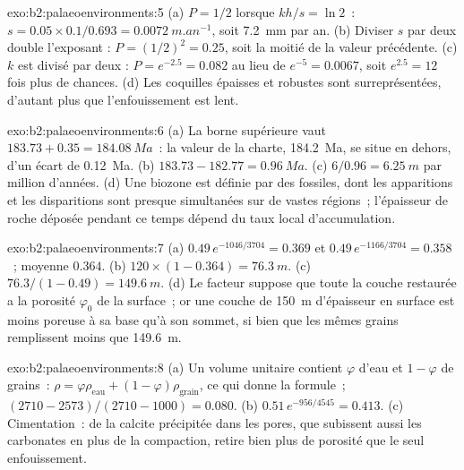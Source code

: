 \begin{solution}{exo:b2:palaeoenvironments:5}
(a) $P = 1/2$ lorsque $kh/s = \ln 2$~: $s = 0.05 \times 0.1/0.693 = \qty{0.0072}{m.an^{-1}}$, soit \qty{7.2}{mm}
par an. (b) Diviser $s$ par deux double l'exposant : $P = (1/2)^2 = 0.25$, soit la moitié de la valeur précédente.
(c) $k$ est divisé par deux : $P = e^{-2.5} = 0.082$ au lieu de $e^{-5} = 0.0067$, soit $e^{2.5} = 12$ fois plus de
chances. (d) Les coquilles épaisses et robustes sont surreprésentées, d'autant plus que l'enfouissement est lent.
\end{solution}

\begin{solution}{exo:b2:palaeoenvironments:6}
(a) La borne supérieure vaut $183.73 + 0.35 = \qty{184.08}{Ma}$~: la valeur de la charte, \qty{184.2}{Ma}, se situe
en dehors, d'un écart de \qty{0.12}{Ma}. (b) $183.73 - 182.77 = \qty{0.96}{Ma}$. (c) $6/0.96 =
\qty{6.25}{m}$ par million d'années. (d) Une biozone est définie par des fossiles, dont les apparitions et les
disparitions sont presque simultanées sur de vastes régions~; l'épaisseur de roche déposée pendant ce temps
dépend du taux local d'accumulation.
\end{solution}

\begin{solution}{exo:b2:palaeoenvironments:7}
(a) $0.49\,e^{-1046/3704} = 0.369$ et $0.49\,e^{-1166/3704} = 0.358$~; moyenne $0.364$. (b) $120
\times (1 - 0.364) = \qty{76.3}{m}$. (c) $76.3/(1 - 0.49) = \qty{149.6}{m}$. (d) Le facteur
suppose que toute la couche restaurée a la porosité $\varphi_0$ de la surface~; or une couche de
\qty{150}{m} d'épaisseur en surface est moins poreuse à sa base qu'à son sommet, si bien que les mêmes grains
remplissent moins que \qty{149.6}{m}.
\end{solution}

\begin{solution}{exo:b2:palaeoenvironments:8}
(a) Un volume unitaire contient $\varphi$ d'eau et $1 - \varphi$ de grains~: $\rho = \varphi
\rho_{\text{eau}} + (1 - \varphi)\rho_{\text{grain}}$, ce qui donne la formule~; $(2710 -
2573)/(2710 - 1000) = 0.080$. (b) $0.51\,e^{-956/4545} = 0.413$. (c) Cimentation~: de la calcite précipitée
dans les pores, que subissent aussi les carbonates en plus de la compaction, retire bien plus de porosité
que le seul enfouissement.
\end{solution}

